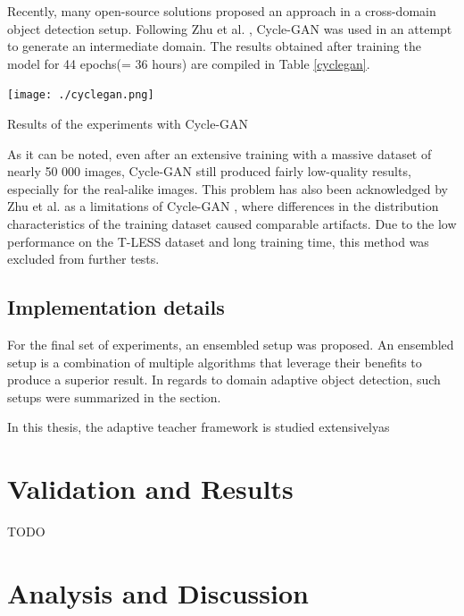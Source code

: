 \documentclass[english, 12pt, a4paper, elec, utf8, a-1b, online]{aaltothesis}
\begin{document}
Recently, many open-source solutions proposed \cite{Inoue_2018_CVPR} \cite{Chen2020} \cite{Arruda2019} an  approach in a cross-domain object detection setup. Following Zhu et al. \cite{Zhu2017}, Cycle-GAN was used in an attempt to generate an intermediate domain. The results obtained after training the model for 44 epochs(= 36 hours) are compiled in Table \ref{cyclegan}.  

\begin{table}[htb]
	\begin{center}
		\texttt{[image: ./cyclegan.png]}
	\end{center}
	\caption{Results of the experiments with Cycle-GAN}
	\begin{center}
		\label{cyclegan}
	\end{center}
\end{table}
\FloatBarrier

As it can be noted, even after an extensive training with a massive dataset of nearly 50 000 images, Cycle-GAN still produced fairly low-quality results, especially for the real-alike images. This problem has also been acknowledged by Zhu et al. as a limitations of Cycle-GAN \cite{Zhu2017}, where differences in the distribution characteristics of the training dataset caused comparable artifacts. Due to the low performance on the T-LESS dataset and long training time, this method was excluded from further tests. 


\subsection{Implementation details}
For the final set of experiments, an ensembled setup was proposed. An ensembled setup is a combination of multiple algorithms that leverage their benefits to produce a superior result. In regards to domain adaptive object detection, such setups were summarized in the  section.  

In this thesis, the adaptive teacher framework is studied extensivelyas

\section{Validation and Results}
TODO

\clearpage

\section{Analysis and Discussion} 
\end{document}
